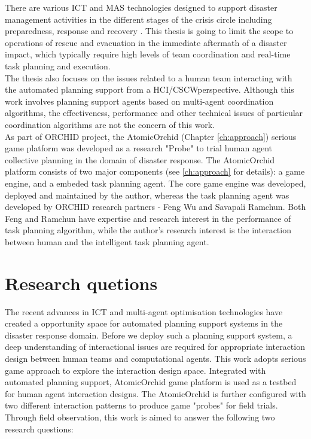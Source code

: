 There are various \ac{ICT} and \ac{MAS} technologies designed to support disaster management activities in the different stages of the crisis circle including preparedness, response and recovery \citep{Wattegama2012}. This thesis is going to limit the scope to operations of rescue and evacuation in the immediate aftermath of a disaster impact, which typically require high levels of team coordination and real-time task planning and execution.\\ 

The thesis also focuses on the issues related to a human team interacting with the automated planning support from a \ac{HCI}/\ac{CSCW}perspective. Although this work involves planning support agents based on multi-agent coordination algorithms, the effectiveness, performance and other technical issues of particular coordination algorithms are not the concern of this work.\\

As part of ORCHID project, the AtomicOrchid (Chapter \ref{ch:approach}) serious game platform was developed as a research "Probe" to trial human agent collective planning in the domain of disaster response. The AtomicOrchid platform consists of two major components (see \ref{ch:approach} for details): a game engine, and a embeded task planning agent. The core game engine was developed, deployed and maintained by the author, whereas the task planning agent was developed by ORCHID research partners - Feng Wu and Savapali Ramchun. Both Feng and Ramchun have expertise and research interest in the performance of task planning algorithm, while the author's research interest is the interaction between human and the intelligent task planning agent. \\

\section{Research quetions}
The recent advances in \ac{ICT} and multi-agent optimisation technologies have created a opportunity space for automated planning support systems in the disaster response domain. Before we deploy such a planning support system, a deep understanding of interactional issues are required for appropriate interaction design between human teams and computational agents. This work adopts serious game approach to explore the interaction design space. Integrated with automated planning support, AtomicOrchid game platform is used as a testbed for human agent interaction designs.  The AtomicOrchid is further configured with two different interaction patterns to produce game "probes" for field trials. Through field observation, this work is aimed to answer the following two research questions:

